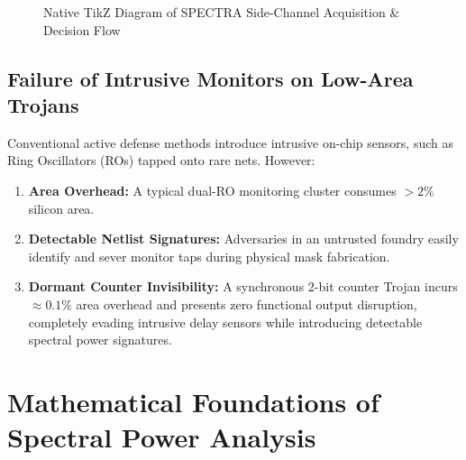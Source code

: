 \documentclass[11pt,a4paper,oneside]{book}
\begin{document}
\begin{figure}[htbp]
{%
}
\caption{Native TikZ Diagram of SPECTRA Side-Channel Acquisition \& Decision Flow}
\label{fig:acquisition_setup}
\end{figure}

\section{Failure of Intrusive Monitors on Low-Area Trojans}

Conventional active defense methods introduce intrusive on-chip sensors, such as Ring Oscillators (ROs) tapped onto rare nets. However:
\begin{enumerate}[leftmargin=1.5em]
  \item \textbf{Area Overhead:} A typical dual-RO monitoring cluster consumes $>2\%$ silicon area.
  \item \textbf{Detectable Netlist Signatures:} Adversaries in an untrusted foundry easily identify and sever monitor taps during physical mask fabrication.
  \item \textbf{Dormant Counter Invisibility:} A synchronous 2-bit counter Trojan incurs $\approx 0.1\%$ area overhead and presents zero functional output disruption, completely evading intrusive delay sensors while introducing detectable spectral power signatures.
\end{enumerate}

\chapter{Mathematical Foundations of Spectral Power Analysis}
\end{document}
